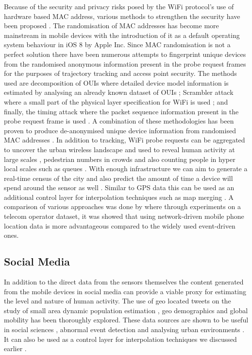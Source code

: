 Because of the security and privacy risks posed by the WiFi protocol’s use of hardware based MAC address, various methods to strengthen the security have been proposed \citep{pang2007, greenstein2008}.
The randomisation of MAC addresses has become more mainstream in mobile devices with the introduction of it as a default operating system behaviour in iOS 8 by Apple Inc.
Since MAC randomisation is not a perfect solution \citep{mathieucunche2016} there have been numerous attempts to fingerprint unique devices from the randomised anonymous information present in the probe request frames for the purposes of trajectory tracking and access point security.
The methods used are decomposition of OUIs where detailed device model information is estimated by analysing an already known dataset of OUIs \citep{martin2016}; Scrambler attack where a small part of the physical layer specification for WiFi is used \citep{bloessl2015}; and finally, the timing attack where the packet sequence information present in the probe request frame is used \citep{matte2016, cheng2016}.
A combination of these methodologies has been proven to produce de-anonymised unique device information from randomised MAC addresses \citep{vanhoef2016}.
In addition to tracking, WiFi probe requests can be aggregated to uncover the urban wireless landscape \citep{rose2010} and used to reveal human activity at large scales \citep{qin2013}, pedestrian numbers in crowds \citep{schauer2014, fukuzaki2015} and also counting people in hyper local scales such as queues \citep{wang2013}.
With enough infrastructure we can aim to generate a real-time census of the city \citep{kontokosta2016} and also predict the amount of time a device will spend around the sensor as well \citep{manweiler2013}.
Similar to GPS data this can be used as an additional control layer for interpolation techniques such as map merging \citep{erinc2013}.
A comparison of various approaches was done by \citep{pinelli2015} where through experiments on a telecom operator dataset, it was showed that using network-driven mobile phone location data is more advantageous compared to the widely used event-driven ones.

\subsection{Social Media}

In addition to the direct data from the sensors themselves the content generated from the mobile devices in social media can provide a viable proxy for estimating the level and nature of human activity.
The use of geo located tweets on the study of small area dynamic population estimation \citep{ordonez2012, marchetti2015, mckenzie2015}, geo demographics \citep{bawa-cavia2011, longley2015, lansley2016b} and global mobility \citep{hawelka2014} has been thoroughly explored.
These data sources are shown to be useful in social sciences \citep{crane2008}, abnormal event detection \citep{chae2012} and analysing urban environments \citep{sagl2012}.
It can also be used as a control layer for interpolation techniques we discussed earlier \citep{lin2015}.

